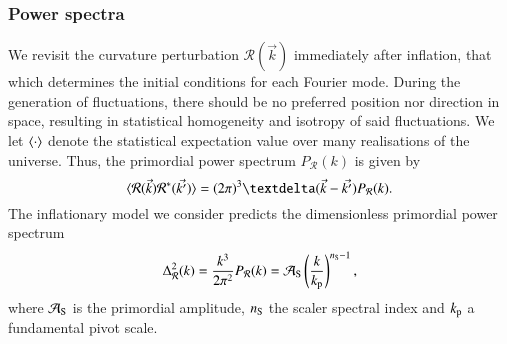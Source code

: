 










\subsubsection{Power spectra}\label{mil4:theo:sec:power_spectrum}
    We revisit the curvature perturbation $\mathcal{R}(\vec{k})$ immediately after inflation, that which determines the initial conditions for each Fourier mode. During the generation of fluctuations, there should be no preferred position nor direction in space, resulting in statistical homogeneity and isotropy of said fluctuations. We let $\langle \cdot \rangle$ denote the statistical expectation value over many realisations of the universe. Thus, the primordial power spectrum $P_\mathcal{R}(k)$ is given by
    \begin{equation}\label{mil4:theo:eq:primordial_power_spectum}
        \avg{\mathcal{R}(\vec{k})\mathcal{R}^*(\vec{k'})} = (2\pi)^3 \deltafunc{\vec{k}-\vec{k'}}P_\mathcal{R}(k).
    \end{equation}
    The inflationary model we consider predicts the dimensionless primordial power spectrum
    \begin{equation}\label{mil4:theo:eq:Delta_R_of_k}
        \Delta^2_\mathcal{R} (k) = \frac{k^3}{2\pi^2} P_\mathcal{R} (k)= \mathcal{A}_\mathrm{S} \left( \frac{k}{k_\mathrm{p}} \right)^{n_\mathrm{S} -1},
    \end{equation}
    where $\mathcal{A}_\mathrm{S}$ is the primordial amplitude, $n_\mathrm{S}$ the scaler spectral index and $k_\mathrm{p}$ a fundamental pivot scale.

